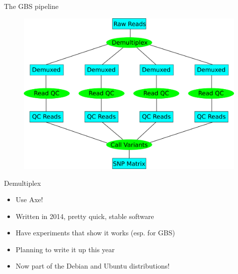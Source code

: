\documentclass[t]{beamer}
\begin{document}
\begin{frame}{The GBS pipeline}
  \begin{figure}[h]
    \centering
    \includegraphics[width=\textwidth]{img/pl-whole.png}
  \end{figure}
\end{frame}

\begin{frame}{Demultiplex}
  \begin{itemize}
    \item Use Axe!
    \item Written in 2014, pretty quick, stable software
    \item Have experiments that show it works (esp. for GBS)
    \item Planning to write it up this year
    \item Now part of the Debian and Ubuntu distributions!
  \end{itemize}
\end{frame}
\end{document}
